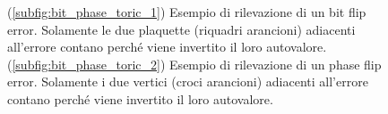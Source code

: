 \begin{figure}[!ht]
	\centering	
	 \quad
	\caption{(\ref{subfig:bit_phase_toric_1}) Esempio di rilevazione di un bit flip error. Solamente le due plaquette (riquadri arancioni) adiacenti all'errore contano perché viene invertito il loro autovalore. (\ref{subfig:bit_phase_toric_2}) Esempio di rilevazione di un phase flip error. Solamente i due vertici (croci arancioni) adiacenti all'errore contano perché viene invertito il loro autovalore.}
    \label{fig:bit_phase_toric}
\end{figure}

